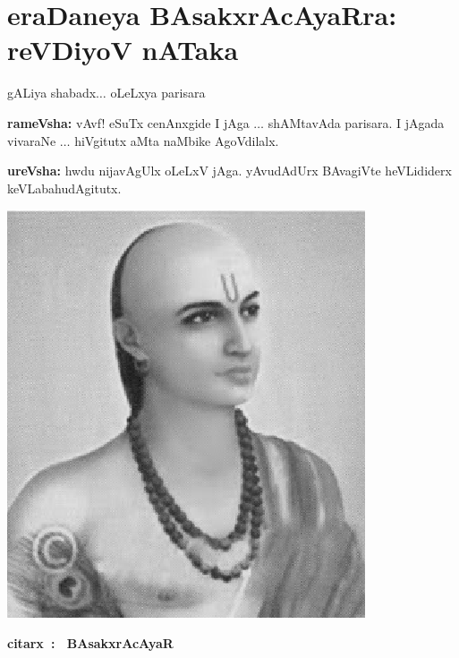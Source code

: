\chapter[eraDaneya BAsakxrAcAyaRra : reVDiyoV nATaka]{eraDaneya BAsakxrAcAyaRra\break : reVDiyoV nATaka}

\begin{minipage}[l]{6.5cm}
\qquad gALiya shabadx$\ldots$ oLeLxya parisara

\smallskip

\smallskip

{\bf rameVsha:} vAvf! eSuTx cenAnxgide I jAga $\ldots$ shAMtavAda parisara. I jAgada vivaraNe $\ldots$ hiVgitutx aMta naMbike AgoVdilalx.

\medskip
\smallskip

{\bf ureVsha:} hwdu nijavAgUlx oLeLxV jAga. yAvudAdUrx BAvagiVte heVLididerx keVLabahudAgitutx.

\medskip
\medskip
\end{minipage}
\begin{minipage}[l]{4cm}
  \centering\includegraphics[scale=0.8]{src/figures/bhaskaracharya-II.eps}
  
  {\bf citarx~:~ BAsakxrAcAyaR}
    \end{minipage}
    
